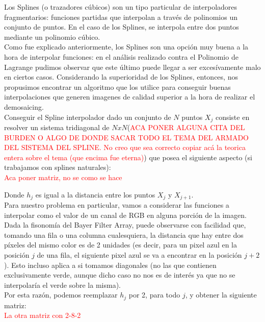 \documentclass[a4paper]{article}
\begin{document}
Los Splines (o trazadores cúbicos) son un tipo particular de interpoladores fragmentarios: funciones partidas que interpolan a través de polinomios un conjunto de puntos. En el caso de los Splines, se interpola entre dos puntos mediante un polinomio cúbico.\\

Como fue explicado anteriormente, los Splines son una opción muy buena a la hora de interpolar funciones: en el análisis realizado contra el Polinomio de Lagrange pudimos observar que este último puede llegar a ser excesívamente malo en ciertos casos. Considerando la superioridad de los Splines, entonces, nos propusimos encontrar un algoritmo que los utilice para conseguir buenas interpolaciones que generen imagenes de calidad superior a la hora de realizar el demosaicing.\\

Conseguir el Spline interpolador dado un conjunto de $N$ puntos $X_j$ consiste en resolver un sistema tridiagonal de $NxN$(\textcolor{red}{ACA PONER ALGUNA CITA DEL BURDEN O ALGO DE DONDE SACAR TODO EL TEMA DEL ARMADO DEL SISTEMA DEL SPLINE. No creo que sea correcto copiar acá la teorica entera sobre el tema (que encima fue eterna)}) que posea el siguiente aspecto (si trabajamos con splines naturales): \\

\textcolor{red}{Aca poner matriz, no se como se hace\\}

\noindent Donde $h_j$ es igual a la distancia entre los puntos $X_j$ y $X_{j+1}$. \\

Para nuestro problema en particular, vamos a considerar las funciones a interpolar como el valor de un canal de RGB en alguna porción de la imagen. Dada la fisonomía del Bayer Filter Array, puede observarse con facilidad que, tomando una fila o una columna cualesquiera, la distancia que hay entre dos píxeles del mismo color es de 2 unidades (es decir, para un pixel azul en la posición $j$ de una fila, el siguiente pixel azul se va a encontrar en la posición $j+2$). Esto incluso aplica a si tomamos diagonales (no las que contienen exclusivamente verde, aunque dicho caso no nos es de interés ya que no se interpolaría el verde sobre la misma). \\
Por esta razón, podemos reemplazar $h_j$ por 2, para todo $j$, y obtener la siguiente matriz: \\

\textcolor{red}{La otra matriz con 2-8-2\\}
\end{document}
